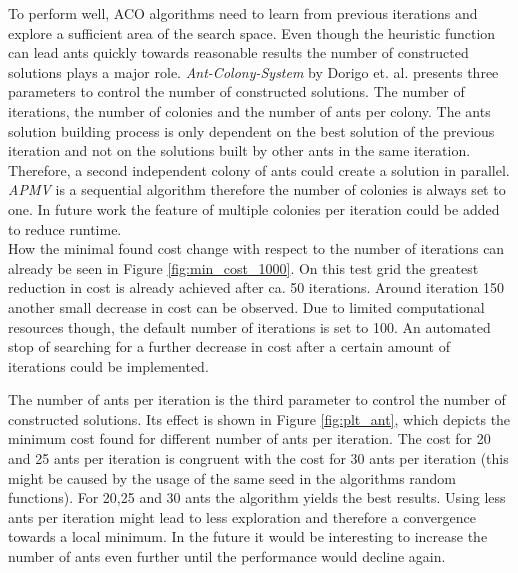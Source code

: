 To perform well, ACO algorithms need to learn from previous iterations and explore a sufficient area of the search space. Even though the heuristic function can lead ants quickly towards reasonable results the number of constructed solutions plays a major role. \textit{Ant-Colony-System} \cite{ant_coloy_system} by Dorigo et. al. presents three parameters to control the number of constructed solutions. The number of iterations, the number of colonies and the number of ants per colony. The ants solution building process is only dependent on the best solution of the previous iteration and not on the solutions built by other ants in the same iteration. Therefore, a second independent colony of ants could create a solution in parallel. \textit{APMV} is a sequential algorithm therefore the number of colonies is always set to one. In future work the feature of multiple colonies per iteration could be added to reduce runtime. \\
How the minimal found cost change with respect to the number of iterations can already be seen in Figure \ref{fig:min_cost_1000}. On this test grid the greatest reduction in cost is already achieved after ca. 50 iterations. Around iteration 150 another small decrease in cost can be observed. Due to limited computational resources though, the default number of iterations is set to 100. An automated stop of searching for a further decrease in cost after a certain amount of iterations could be implemented.

The number of ants per iteration is the third parameter to control the number of constructed solutions. Its effect is shown in Figure \ref{fig:plt_ant}, which depicts the minimum cost found for different number of ants per iteration. The cost for 20 and 25 ants per iteration is congruent with the cost for 30 ants per iteration (this might be caused by the usage of the same seed in the algorithms random functions). For 20,25 and 30 ants the algorithm yields the best results. Using less ants per iteration might lead to less exploration and therefore a convergence towards a local minimum. In the future it would be interesting to increase the number of ants even further until the performance would decline again.

